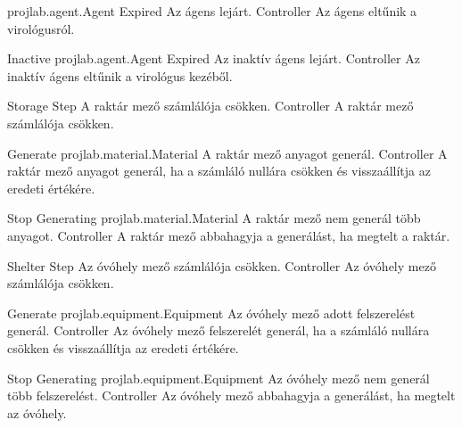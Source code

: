 \begin{use-case}
    {projlab.agent.Agent Expired}
    {Az ágens lejárt.}
    {Controller}
    Az ágens eltűnik a virológusról.
\end{use-case}

\begin{use-case}
    {Inactive projlab.agent.Agent Expired}
    {Az inaktív ágens lejárt.}
    {Controller}
    Az inaktív ágens eltűnik a virológus kezéből.
\end{use-case}

\begin{use-case}
    {Storage Step}
    {A raktár mező számlálója csökken.}
    {Controller}
    A raktár mező számlálója csökken.
\end{use-case}

\begin{use-case}
    {Generate projlab.material.Material}
    {A raktár mező anyagot generál.}
    {Controller}
    A raktár mező anyagot generál, ha a számláló nullára csökken és visszaállítja az eredeti értékére.
\end{use-case}

\begin{use-case}
    {Stop Generating projlab.material.Material}
    {A raktár mező nem generál több anyagot.}
    {Controller}
    A raktár mező abbahagyja a generálást, ha megtelt a raktár.
\end{use-case}

\begin{use-case}
    {Shelter Step}
    {Az óvóhely mező számlálója csökken.}
    {Controller}
    Az óvóhely mező számlálója csökken.
\end{use-case}

\begin{use-case}
    {Generate projlab.equipment.Equipment}
    {Az óvóhely mező adott felszerelést generál.}
    {Controller}
    Az óvóhely mező felszerelét generál, ha a számláló nullára csökken és visszaállítja az eredeti értékére.
\end{use-case}

\begin{use-case}
    {Stop Generating projlab.equipment.Equipment}
    {Az óvóhely mező nem generál több felszerelést.}
    {Controller}
    Az óvóhely mező abbahagyja a generálást, ha megtelt az óvóhely.
\end{use-case}

